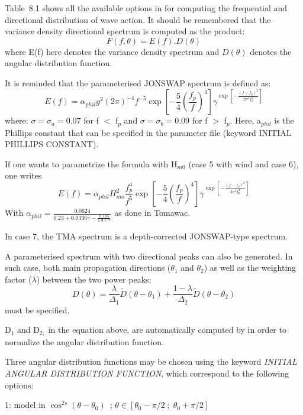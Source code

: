 Table~8.1 shows all the available options in \tomawac for computing the frequential and directional distribution of wave action. It should be remembered that the variance density directional spectrum is computed as the product:
\[F(f,\theta )=E(f).D(\theta )\]
where E(f) here denotes the variance density spectrum and $D\left(\theta \right)$ denotes the angular distribution function.

 It is reminded that the parameterised JONSWAP spectrum is defined as:
\[E(f)=\alpha _{phil} g^{2} (2\pi )^{-4} f^{-5} \exp \left[-\frac{5}{4} \left(\frac{f_{p}^{} }{f^{} } \right)^{4} \right]\gamma ^{\exp \left[-\frac{\left(f-f_{p} \right)^{2} }{2\sigma ^{2} f_{p}^{2} } \right]} \]
where:  $\sigma =\sigma _{a} =0.07$ for f $<$ f${}_{p}$  and  $\sigma =\sigma _{b} =0.09$ for f $>$ f${}_{p}$. Here, a${}_{phil}$  is the Phillips constant that can be specified in the parameter file (keyword INITIAL PHILLIPS CONSTANT).

 If one wants to parametrize the formula with H${}_{m0}$ (case 5 with wind and case 6), one writes
\[E(f)=\alpha _{phil} H_{mo}^{2} \frac{f_{p}^{4} }{f^{5} } \exp \left[-\frac{5}{4} \left(\frac{f_{p}^{} }{f^{} } \right)^{4} \right]\gamma ^{\exp \left[-\frac{\left(f-f_{p} \right)^{2} }{2\sigma ^{2} f_{p}^{2} } \right]} \]
With $\alpha _{phil} =\frac{0.0624}{0.23+0.0336\gamma -\frac{0.185}{1.9+\gamma } } $ as done in Tomawac.



 In case 7, the TMA spectrum is a depth-corrected JONSWAP-type spectrum.

 A parameterised spectrum with two directional peaks can also be generated. In such case, both main propagation directions ($\theta _{1} $ and $\theta _{2} $) as well as the weighting factor ($\lambda $) between the two power peaks:
\[D(\theta )=\frac{\lambda }{\Delta _{1} } \tilde{D}(\theta -\theta _{1} )+\frac{1-\lambda }{\Delta _{2} } \tilde{D}(\theta -\theta _{2} )\]
must be specified.

 D${}_{1}$ and D${}_{2,}$ in the equation above, are automatically computed by \tomawac in order to normalize the angular distribution function.

 Three angular distribution functions may be chosen using the keyword \textit{INITIAL ANGULAR DISTRIBUTION FUNCTION}, which correspond to the following options:

 1:  model in $\cos ^{2s} (\theta -\theta _{0} )$~; $\theta \in \left[\theta _{0} -\pi /2\; ;\; \theta _{0} +\pi /2\right]$

